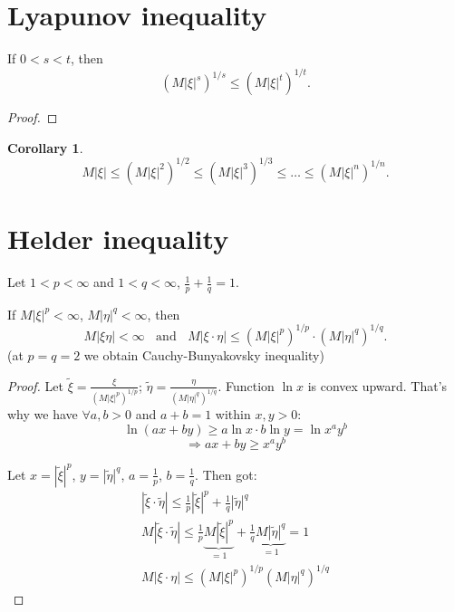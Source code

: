 \documentclass[12pt,letterpaper]{report}
\newtheorem{corollary}[theorem]{Corollary}      %
\begin{document}
\section{Lyapunov inequality}
If $0 < s < t$, then
\[
\left( M|\xi|^{s} \right)^{1/s} \leq \left( M|\xi|^{t} \right) ^{1/t}
.\] 
\begin{proof}
    
\end{proof}

\begin{corollary}
   \[
       M|\xi| \leq \left(M|\xi|^2\right)^{1/2} \leq \left(M|\xi|^{3}\right)^{1/3} \leq \dots \leq \left(M|\xi|^{n}\right)^{1/n}
   .\]  
\end{corollary}

\section{Helder inequality}
Let $1 < p < \infty$ and $1 < q < \infty$, $\frac{1}{p} + \frac{1}{q} = 1$.

If $M|\xi|^{p} < \infty$, $M|\eta|^{q} < \infty$, then
\[
    M|\xi \eta | < \infty \;\; \text{ and } \;\; M|\xi \cdot \eta | \leq \left( M|\xi|^{p} \right)^{1/p} \cdot \left( M|\eta|^{q} \right)^{1/q}
.\] 
(at $p = q = 2$ we obtain Cauchy-Bunyakovsky inequality)
\begin{proof}
    Let $\tilde{\xi} = \frac{\xi}{\left(M|\xi|^{p}\right)^{1/p}}$; $\tilde{\eta} = \frac{\eta}{\left(M|\eta|^{q}\right)^{1/q}}$.
    Function $\ln x$ is convex upward. That's why we have $\forall a, b > 0$ and $a + b = 1$ within $x, y > 0$:
    \[ \ln(ax + by) \geq a \ln x \cdot b \ln y = \ln x^a y^b \]
    \[ \Rightarrow ax + by \geq x^a y^b \]

    Let $x = |\tilde{\xi}|^p$, $y = |\tilde{\eta}|^q$, $a = \frac{1}{p}$, $b = \frac{1}{q}$.
    Then got:
    $$
    \begin{array}{l}
    |\tilde{\xi} \cdot \tilde{\eta}| \leqslant\frac{1}{p}\left|\tilde{\xi}\right|^{p} + \frac{1}{q}\left| \tilde{\eta}\right|^{q} \\
        M|\tilde{\xi} \cdot \tilde{\eta}| \leqslant \frac{1}{p} \underbrace{M|\tilde{\xi}|^{p}}_{= 1}+\frac{1}{q} \underbrace{M|\tilde{\eta}|^{q}}_{=1} =1 \\
    M|\xi \cdot \eta| \leqslant\left(M|\xi|^{p}\right)^{1 / p}\left(M|\eta|^{q}\right)^{1 / q}
    \end{array}
    $$
    
\end{proof}
\end{document}
